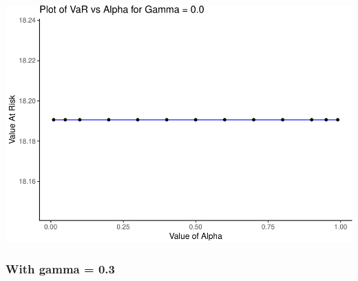 \documentclass[]{article}
\begin{document}
\includegraphics{Integrated_Management_Formulation_Model_files/figure-latex/unnamed-chunk-10-1.pdf}

\subsubsection{With gamma = 0.3}\label{with-gamma-0.3}
\end{document}
